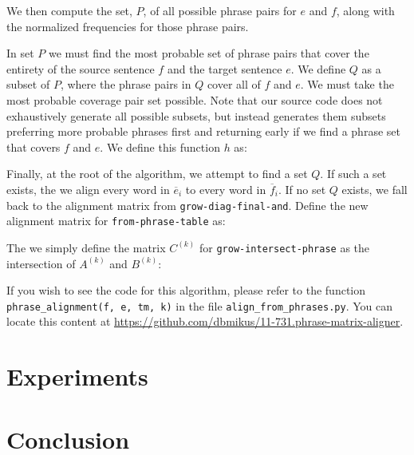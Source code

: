 \documentclass[twocolumn]{article}
\newcommand{\originalAlign}{\texttt{grow-diag-final-and}}
\newcommand{\phraseAlign}{\texttt{from-phrase-table}}
\newcommand{\phraseIntersectAlign}{\texttt{grow-intersect-phrase}}
\begin{document}
We then compute the set, $P$, of all possible phrase pairs for $e$ and $f$,
along with the normalized frequencies for those phrase pairs.
\wrapSmall{\allPhrasePairs{}}

In set $P$ we must find the most probable set of phrase pairs that cover the
entirety of the source sentence $f$ and the target sentence $e$. We define $Q$
as a subset of $P$, where the phrase pairs in $Q$ cover all of $f$ and $e$.
We must take the most probable coverage pair set possible. Note that our source
code does not exhaustively generate all possible subsets, but instead generates
them subsets preferring more probable phrases first and returning early if we
find a phrase set that covers $f$ and $e$. We define this function $h$ as:
\wrapSmall{\optPhraseCoverage{}}

Finally, at the root of the algorithm, we attempt to find a set $Q$. If such a
set exists, the we align every word in $\overline{e}_i$ to every word in
$\overline{f}_i$. If no set $Q$ exists, we fall back to the alignment matrix
from \originalAlign{}. Define the new alignment matrix for \phraseAlign{} as:
\wrapSmall{\growPhraseMatrix{}}

The we simply define the matrix $C^{(k)}$ for \phraseIntersectAlign{}
as the intersection of $A^{(k)}$ and $B^{(k)}$:
\wrapSmall{\intersectMatrix{}}


If you wish to see the code for this algorithm, please refer to
the function \verb!phrase_alignment(f, e, tm, k)!
in the file \verb!align_from_phrases.py!.
You can locate this content at
\href{https://github.com/dbmikus/11-731.phrase-matrix-aligner}
     {\underline{https://github.com/dbmikus/11-731.phrase-matrix-aligner}}.

\section{Experiments}


\section{Conclusion}
\end{document}
